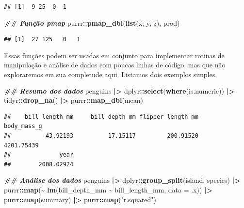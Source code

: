 \documentclass[
]{article}
\newenvironment{Shaded}{\begin{snugshade}}{\end{snugshade}}
\newcommand{\AttributeTok}[1]{\textcolor[rgb]{0.13,0.29,0.53}{#1}}
\newcommand{\DocumentationTok}[1]{\textcolor[rgb]{0.56,0.35,0.01}{\textbf{\textit{#1}}}}
\newcommand{\FunctionTok}[1]{\textcolor[rgb]{0.13,0.29,0.53}{\textbf{#1}}}
\newcommand{\NormalTok}[1]{#1}
\newcommand{\SpecialCharTok}[1]{\textcolor[rgb]{0.81,0.36,0.00}{\textbf{#1}}}
\newcommand{\StringTok}[1]{\textcolor[rgb]{0.31,0.60,0.02}{#1}}
\begin{document}
\begin{verbatim}
## [1]  9 25  0  1
\end{verbatim}

\begin{Shaded}
\begin{Highlighting}[]
\DocumentationTok{\#\# Função pmap}
\NormalTok{purrr}\SpecialCharTok{::}\FunctionTok{pmap\_dbl}\NormalTok{(}\FunctionTok{list}\NormalTok{(x, y, z), prod)}
\end{Highlighting}
\end{Shaded}

\begin{verbatim}
## [1]  27 125   0   1
\end{verbatim}

Essas funções podem ser usadas em conjunto para implementar rotinas de manipulação e análise de dados com poucas linhas de código, mas que não exploraremos em sua completude aqui. Listamos dois exemplos simples.

\begin{Shaded}
\begin{Highlighting}[]
\DocumentationTok{\#\# Resumo dos dados}
\NormalTok{penguins }\SpecialCharTok{|\textgreater{}} 
\NormalTok{    dplyr}\SpecialCharTok{::}\FunctionTok{select}\NormalTok{(}\FunctionTok{where}\NormalTok{(is.numeric)) }\SpecialCharTok{|\textgreater{}} 
\NormalTok{    tidyr}\SpecialCharTok{::}\FunctionTok{drop\_na}\NormalTok{() }\SpecialCharTok{|\textgreater{}} 
\NormalTok{    purrr}\SpecialCharTok{::}\FunctionTok{map\_dbl}\NormalTok{(mean)}
\end{Highlighting}
\end{Shaded}

\begin{verbatim}
##    bill_length_mm     bill_depth_mm flipper_length_mm       body_mass_g 
##          43.92193          17.15117         200.91520        4201.75439 
##              year 
##        2008.02924
\end{verbatim}

\begin{Shaded}
\begin{Highlighting}[]
\DocumentationTok{\#\# Análise dos dados}
\NormalTok{penguins }\SpecialCharTok{|\textgreater{}}
\NormalTok{    dplyr}\SpecialCharTok{::}\FunctionTok{group\_split}\NormalTok{(island, species) }\SpecialCharTok{|\textgreater{}} 
\NormalTok{    purrr}\SpecialCharTok{::}\FunctionTok{map}\NormalTok{(}\SpecialCharTok{\textasciitilde{}} \FunctionTok{lm}\NormalTok{(bill\_depth\_mm }\SpecialCharTok{\textasciitilde{}}\NormalTok{ bill\_length\_mm, }\AttributeTok{data =}\NormalTok{ .x)) }\SpecialCharTok{|\textgreater{}} 
\NormalTok{    purrr}\SpecialCharTok{::}\FunctionTok{map}\NormalTok{(summary) }\SpecialCharTok{|\textgreater{}} 
\NormalTok{    purrr}\SpecialCharTok{::}\FunctionTok{map}\NormalTok{(}\StringTok{"r.squared"}\NormalTok{)}
\end{Highlighting}
\end{Shaded}
\end{document}
